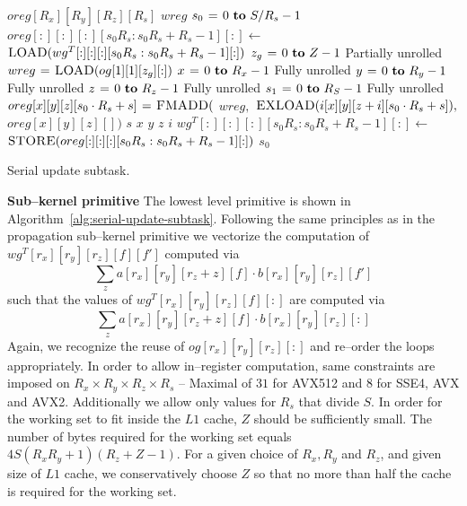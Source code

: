   \begin{algorithm}
    {\footnotesize
      \begin{codebox}
        \li {} $oreg[R_x][R_y][R_z][R_s]$
        \li {} $wreg$
        \li \For $s_0 \gets 0 \To S/R_s - 1$
        \li \Do $oreg[:][:][:][s_0R_s:s_0R_s+R_s-1][:] \gets$
        \li   \Do $\textnormal{\scshape LOAD}(wg^T[:][:][:][s_0R_s:s_0R_s+R_s-1][:])$
        \End
        \li \For $z_g \gets 0 \To Z-1$ \Comment Partially unrolled
        \li   \Do $wreg \mathrel{\hspace{1pt}=\hspace{1pt}} \textnormal{\scshape LOAD}(og[1][1][z_g][:])$
        \li   \For $x \gets 0 \To R_x-1$ \Comment Fully unrolled
        \li   \Do \For $y \gets 0 \To R_y-1$  \Comment Fully unrolled
        \li   \Do \For $z \gets 0 \To R_z-1$  \Comment Fully unrolled
        \li   \Do \For $s_1 \gets 0 \To R_S-1$   \Comment Fully unrolled
        \li   \Do $oreg[x][y][z][s_0 \cdot R_s + s] \mathrel{\hspace{1pt}=\hspace{1pt}} \textnormal{\scshape FMADD}($
        \li   \Do $wreg,$
        \li       $\textnormal{\scshape EXLOAD}(i[x][y][z+i][s_0 \cdot R_s + s]),$
        \li       $oreg[x][y][z][])$
        \End
        \End \li {} $s$
        \End \li {} $x$
        \End \li {} $y$
        \End \li {} $z$
        \End \li {} $i$
        \li $wg^T[:][:][:][s_0R_s:s_0R_s+R_s-1][:] \gets$
        \li \Do $\textnormal{\scshape STORE}(oreg[:][:][:][s_0R_s:s_0R_s+R_s-1][:])$
        \End
        \End \li {} $s_0$
      \end{codebox}
    \caption{Serial update subtask.}
    \label{alg:serial-update-subtask}
    }
  \end{algorithm}

  {\bf Sub--kernel primitive} \quad The lowest level primitive is
  shown in Algorithm~\ref{alg:serial-update-subtask}.  Following the
  same principles as in the propagation sub--kernel primitive we
  vectorize the computation of $wg^T[r_x][r_y][r_z][f][f']$ computed
  via {\small
  \[
  \sum_{z}
  a[r_x][r_y][r_z+z][f] \cdot b[r_x][r_y][r_z][f']
  \]
  } such that the values of $wg^T[r_x][r_y][r_z][f][:]$ are computed
  via {\small
  \[
  \sum_{z}
  a[r_x][r_y][r_z+z][f] \cdot b[r_x][r_y][r_z][:]
  \]
  } Again, we recognize the reuse of $og[r_x][r_y][r_z][:]$ and
  re--order the loops appropriately.  In order to allow in--register
  computation, same constraints are imposed on $R_x \times R_y \times
  R_z \times R_s$ -- Maximal of $31$ for AVX512 and $8$ for SSE4, AVX
  and AVX2.  Additionally we allow only values for $R_s$ that divide
  $S$.  In order for the working set to fit inside the $L1$ cache, $Z$
  should be sufficiently small.  The number of bytes required for the
  working set equals $4S(R_xR_y+1)(R_z+Z-1)$.  For a given choice of
  $R_x, R_y$ and $R_z$, and given size of $L1$ cache, we
  conservatively choose $Z$ so that no more than half the cache is
  required for the working set.

